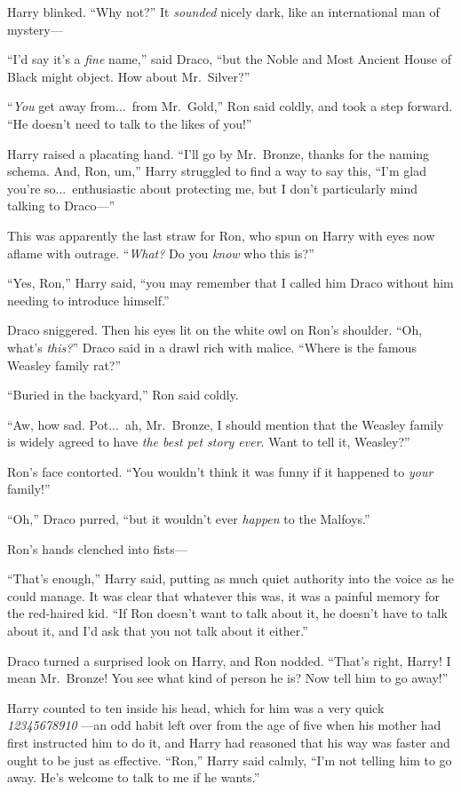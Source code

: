 Harry blinked. “Why not?” It \emph{sounded} nicely dark, like an international man of mystery—

“I’d say it’s a \emph{fine} name,” said Draco, “but the Noble and Most Ancient House of Black might object. How about Mr.~Silver?”

“\emph{You} get away from...\ from Mr.~Gold,” Ron said coldly, and took a step forward. “He doesn’t need to talk to the likes of you!”

Harry raised a placating hand. “I’ll go by Mr.~Bronze, thanks for the naming schema. And, Ron, um,” Harry struggled to find a way to say this, “I’m glad you’re so...\ enthusiastic about protecting me, but I don’t particularly mind talking to Draco—”

This was apparently the last straw for Ron, who spun on Harry with eyes now aflame with outrage. “\emph{What?} Do you \emph{know} who this is?”

“Yes, Ron,” Harry said, “you may remember that I called him Draco without him needing to introduce himself.”

Draco sniggered. Then his eyes lit on the white owl on Ron’s shoulder. “Oh, what’s \emph{this?}” Draco said in a drawl rich with malice. “Where is the famous Weasley family rat?”

“Buried in the backyard,” Ron said coldly.

“Aw, how sad. Pot...\ ah, Mr.~Bronze, I should mention that the Weasley family is widely agreed to have \emph{the best pet story ever}. Want to tell it, Weasley?”

Ron’s face contorted. “You wouldn’t think it was funny if it happened to \emph{your} family!”

“Oh,” Draco purred, “but it wouldn’t ever \emph{happen} to the Malfoys.”

Ron’s hands clenched into fists—

“That’s enough,” Harry said, putting as much quiet authority into the voice as he could manage. It was clear that whatever this was, it was a painful memory for the red-haired kid. “If Ron doesn’t want to talk about it, he doesn’t have to talk about it, and I’d ask that you not talk about it either.”

Draco turned a surprised look on Harry, and Ron nodded. “That’s right, Harry! I mean Mr.~Bronze! You see what kind of person he is? Now tell him to go away!”

Harry counted to ten inside his head, which for him was a very quick \emph{12345678910} —an odd habit left over from the age of five when his mother had first instructed him to do it, and Harry had reasoned that his way was faster and ought to be just as effective. “Ron,” Harry said calmly, “I’m not telling him to go away. He’s welcome to talk to me if he wants.”

